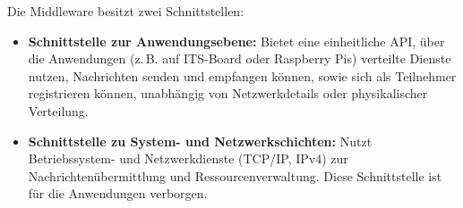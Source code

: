 Die Middleware besitzt zwei Schnittstellen:

\begin{itemize}
	\item \textbf{Schnittstelle zur Anwendungsebene:}  
	Bietet eine einheitliche API, über die Anwendungen (z.\,B. auf ITS-Board oder Raspberry Pis) verteilte Dienste nutzen, Nachrichten senden und empfangen können, sowie sich als Teilnehmer registrieren können, unabhängig von Netzwerkdetails oder physikalischer Verteilung.
	
	\item \textbf{Schnittstelle zu System- und Netzwerkschichten:}  
	Nutzt Betriebssystem- und Netzwerkdienste (TCP/IP, IPv4) zur Nachrichtenübermittlung und Ressourcenverwaltung. Diese Schnittstelle ist für die Anwendungen verborgen.
\end{itemize}